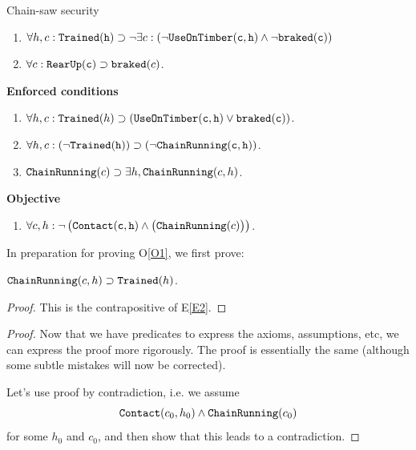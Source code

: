 \begin{example}{Chain-saw security}
\begin{enumerate}[{A}1.]
\hspace{-9mm}{\bf Assumptions}

\item\label{A2a} $\forall h,c: {\tt Trained(h)} \supset \neg\exists c:\left(\neg {\tt UseOnTimber(c,h)} \wedge \neg{\tt braked(c)} \right)$
\item\label{A3} $\forall c: {\tt RearUp(c)} \supset {\tt braked}(c)$.
\end{enumerate}

{\bf Enforced conditions}

\begin{enumerate}[{E}1.]
\item\label{E1} 
$\forall h,c: {\tt Trained}(h) \supset \left( {\tt UseOnTimber(c,h)} \vee {\tt braked(c)} \right)$.

\item\label{E2} $\forall h, c: (\neg{\tt Trained(h)}) \supset (\neg{\tt ChainRunning(c,h)})$.

\item\label{E3} ${\tt ChainRunning(}c{\tt )} \supset \exists h,{\tt ChainRunning}(c,h{\tt )}$.
\end{enumerate}

{\bf Objective}

\begin{enumerate}[{O}1.]
\item\label{O1} $\forall c,h: \neg\left({\tt Contact(c,h)} 
		\wedge \big({\tt ChainRunning(}c{\tt )}\big)\right)$.
\end{enumerate}

In preparation for proving O\ref{O1}, we first prove:

\begin{proposition}\label{chrun--trained}
		${\tt ChainRunning}(c,h) \supset {\tt Trained}(h)$.
\end{proposition}

\begin{proof}
		This is the contrapositive of E\ref{E2}.
\end{proof}

\begin{proof}
Now that we have predicates to express the axioms, assumptions, etc, we can express the proof 
more rigorously. The proof is essentially the same (although some subtle mistakes will now
be corrected). 

Let's use proof by contradiction, i.e. we assume 
\begin{equation}\label{assumedforcontradiction}
{\tt Contact(}c_0,h_0{\tt )} 
\wedge {\tt ChainRunning(}c_0{\tt )}
\end{equation}
for some $h_0$ and $c_0$, 
and then show that this leads to a contradiction.


\end{proof}
\end{example}
